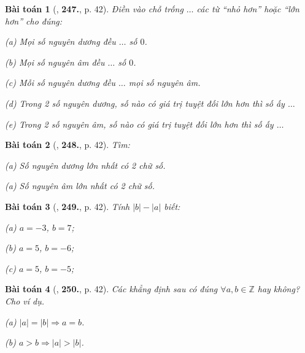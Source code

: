\documentclass{article}
\numberwithin{equation}{section}
\newtheorem{baitoan}{Bài toán}
\begin{document}
\begin{baitoan}[\cite{Binh_Toan_6_tap_1}, \textbf{247.}, p. 42]
	Điền vào chỗ trống $\ldots$ các từ ``nhỏ hơn'' hoặc ``lớn hơn'' cho đúng:
	\begin{enumerate*}
		\item[(a)] Mọi số nguyên dương đều $\ldots$ số $0$.
		\item[(b)] Mọi số nguyên âm đều $\ldots$ số $0$.
		\item[(c)] Mỗi số nguyên dương đều $\ldots$ mọi số nguyên âm.
		\item[(d)] Trong 2 số nguyên dương, số nào có giá trị tuyệt đối lớn hơn thì số ấy $\ldots$
		\item[(e)] Trong 2 số nguyên âm, số nào có giá trị tuyệt đối lớn hơn thì số ấy $\ldots$
	\end{enumerate*}
\end{baitoan}

\begin{baitoan}[\cite{Binh_Toan_6_tap_1}, \textbf{248.}, p. 42]
	Tìm:
	\begin{enumerate*}
		\item[(a)] Số nguyên dương lớn nhất có 2 chữ số.
		\item[(a)] Số nguyên âm lớn nhất có 2 chữ số.
	\end{enumerate*}
\end{baitoan}

\begin{baitoan}[\cite{Binh_Toan_6_tap_1}, \textbf{249.}, p. 42]
	Tính $|b| - |a|$ biết: 
	\begin{enumerate*}
		\item[(a)] $a = -3$, $b = 7$;
		\item[(b)] $a = 5$, $b = -6$;
		\item[(c)] $a = 5$, $b = -5$;
	\end{enumerate*}
\end{baitoan}

\begin{baitoan}[\cite{Binh_Toan_6_tap_1}, \textbf{250.}, p. 42]
	Các khẳng định sau có đúng $\forall a,b\in\mathbb{Z}$ hay không? Cho ví dụ.
	\begin{enumerate*}
		\item[(a)] $|a| = |b|\Rightarrow a = b$.
		\item[(b)] $a > b\Rightarrow|a| > |b|$.
	\end{enumerate*}
\end{baitoan}

\end{document}
